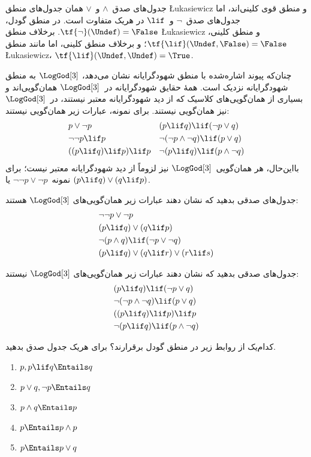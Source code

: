\documentclass[../../../include/open-logic-section]{subfiles}
\begin{document}
جدول‌های صدق~$\land$ و~$\lor$ همان جدول‌های منطق \L ukasiewicz و
منطق قوی کلینی‌اند، اما جدول‌های صدق~$\lnot$ و~$\lif$ در هریک متفاوت
است. در منطق گودل، $\tf{\lnot}(\Undef) = \False$. برخلاف منطق
\L ukasiewicz و منطق کلینی، $\tf{\lif}(\Undef, \False) = \False$؛ و
برخلاف منطق کلینی، اما مانند منطق \L ukasiewicz،
$\tf{\lif}(\Undef, \Undef) = \True$.

چنان‌که پیوند اشاره‌شده با منطق شهودگرایانه نشان می‌دهد، $\LogGod[3]$
به منطق شهودگرایانه نزدیک است. همهٔ حقایق شهودگرایانه در~$\LogGod[3]$
همان‌گویی‌اند و بسیاری از همان‌گویی‌های کلاسیک که از دید شهودگرایانه
معتبر نیستند، در~$\LogGod[3]$ نیز همان‌گویی نیستند. برای نمونه، عبارات
زیر همان‌گویی نیستند:
\begin{align*}
  & p \lor \lnot p && (p \lif q) \lif (\lnot p \lor q) \\
  & \lnot\lnot p \lif p && \lnot(\lnot p \land \lnot q) \lif (p \lor q) \\
  & ((p \lif q) \lif p) \lif p && \lnot(p \lif q) \lif (p \land \lnot q)
\end{align*}
بااین‌حال، هر همان‌گویی~$\LogGod[3]$ نیز لزوماً از دید شهودگرایانه
معتبر نیست؛ برای نمونه~$\lnot\lnot p \lor \lnot p$ یا
$(p \lif q) \lor (q \lif p)$.

\begin{prob}
  جدول‌های صدقی بدهید که نشان دهند عبارات زیر همان‌گویی‌های
  $\LogGod[3]$ هستند:
  \begin{align*}
    & \lnot\lnot p \lor \lnot p\\
    & (p \lif q) \lor (q \lif p) \\
    & \lnot(p \land q) \lif (\lnot p \lor \lnot q) \\
    & (p \lif q) \lor (q \lif r) \lor (r \lif s)
  \end{align*}
\end{prob}

\begin{prob}
  جدول‌های صدقی بدهید که نشان دهند عبارات زیر همان‌گویی‌های
  $\LogGod[3]$ نیستند:
  \begin{align*}
    & (p \lif q) \lif (\lnot p \lor q) \\
    & \lnot(\lnot p \land \lnot q) \lif (p \lor q) \\
    & ((p \lif q) \lif p) \lif p \\
    & \lnot(p \lif q) \lif (p \land \lnot q)
  \end{align*}
\end{prob}

\begin{prob}
  کدام‌یک از روابط زیر در منطق گودل برقرارند؟ برای هریک جدول صدق بدهید.
  \begin{enumerate}
    \item $p, p \lif q \Entails q$
    \item $p \lor q, \lnot p \Entails q$
    \item $p \land q \Entails p$
    \item $p \Entails p \land p$
    \item $p \Entails p \lor q$
  \end{enumerate}
\end{prob}
\end{document}
